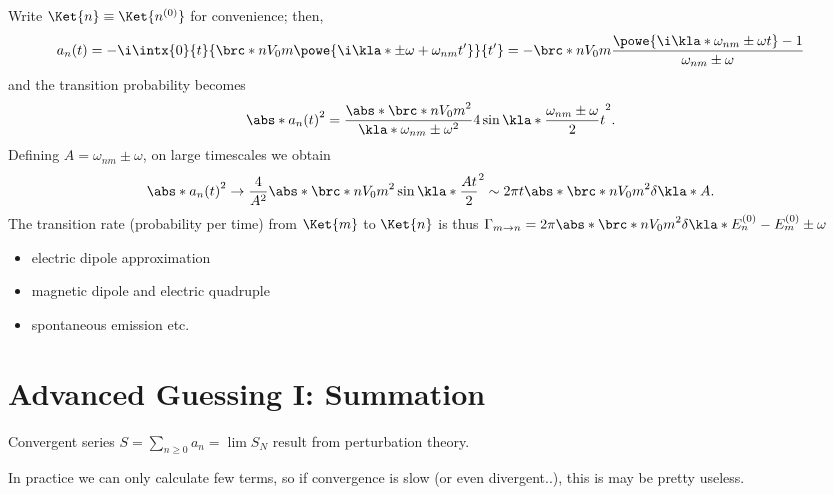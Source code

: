 \documentclass[english, parskip=full]{scrbook}
\newcommand{\example}[3]{\begin{tcolorbox}[colback=colorbackgroundexample,colframe=colorexample, breakable,enhanced,title={\textbf{#1}: #2.}]#3\end{tcolorbox}}
\begin{document}
\example{Fermi's Golden Rule}{$V(t) = V_\powe{\pm\i\omega t}$}{Write $\Ket{n} \equiv \Ket{n^{(0)}}$ for convenience; then,
\begin{align}
a_n(t) &= -\i \intx{0}{t}{\brc*{n}{V_0}{m} \powe{\i\kla*{\pm \omega + \omega_{nm}}t'}}{t'} = -\brc*{n}{V_0}{m} \frac{\powe{\i \kla*{\omega_{nm} \pm \omega}t} - 1}{\omega_{nm} \pm \omega}
\end{align}
and the transition probability becomes
\begin{align}
\abs*{a_n(t)}^2 &= \frac{\abs*{\brc*{n}{V_0}{m}}^2}{\kla*{\omega_{nm} \pm \omega}^2} 4\sin\kla*{\frac{\omega_{nm} \pm \omega}{2}t}^2.
\end{align}
Defining $A=\omega_{nm}\pm\omega$, on large timescales we obtain
\begin{align}
\abs*{a_n(t)}^2 &\rightarrow \frac{4}{A^2} \abs*{\brc*{n}{V_0}{m}}^2 \sin\kla*{\frac{At}{2}}^2 \sim 2\pi t \abs*{\brc*{n}{V_0}{m}}^2 \delta\kla*{A}.
\end{align}
The transition rate (probability per time) from $\Ket{m}$ to $\Ket{n}$ is thus $\Gamma_{m\rightarrow n} = 2\pi \abs*{\brc*{n}{V_0}{m}}^2 \delta\kla*{E_n^{(0)} - E_m^{(0)} \pm \omega}$
}
\example{Absorption and Emission of EM waves by atoms}{}{\begin{itemize}
\item electric dipole approximation
\item magnetic dipole and electric quadruple 
\item spontaneous emission etc.
\end{itemize}
}
\chapter{Advanced Guessing I: Summation}
Convergent series $S=\sum_{n\ge 0} a_n = \lim S_N$ result from perturbation theory.

In practice we can only calculate few terms, so if convergence is slow (or even divergent..), this is may be pretty useless.
\end{document}
